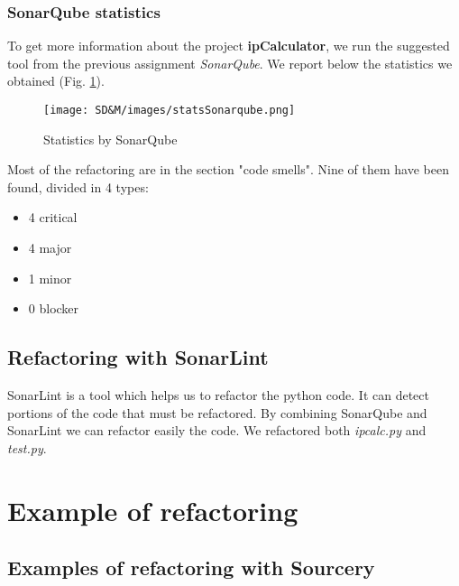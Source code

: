 \documentclass[unicode,11pt,a4paper,oneside,numbers=endperiod,openany]{scrartcl}
\begin{document}
\subsubsection{SonarQube statistics}
To get more information about the project \textbf{ipCalculator}, we run the suggested tool from the previous assignment \textit{SonarQube}. We report below the statistics we obtained (Fig. \ref{fig:stats}). 

\begin{figure}[H]
\texttt{[image: SD\&M/images/statsSonarqube.png]}
\centering
\caption{Statistics by SonarQube}
\label{fig:stats}
\end{figure}
Most of the refactoring are in the section "code smells". Nine of them have been found, divided in 4 types:
\begin{itemize}
\item 4 critical
\item 4 major
\item 1 minor
\item 0 blocker

\end{itemize}
\subsection{Refactoring with SonarLint}
SonarLint is a tool which helps us to refactor the python code. It can detect portions of the code that must be refactored. By combining SonarQube and SonarLint we can refactor easily the code. We refactored both \textit{ipcalc.py} and \textit{test.py}. 


\section{Example of refactoring}

\subsection{Examples of refactoring with Sourcery}
\end{document}
